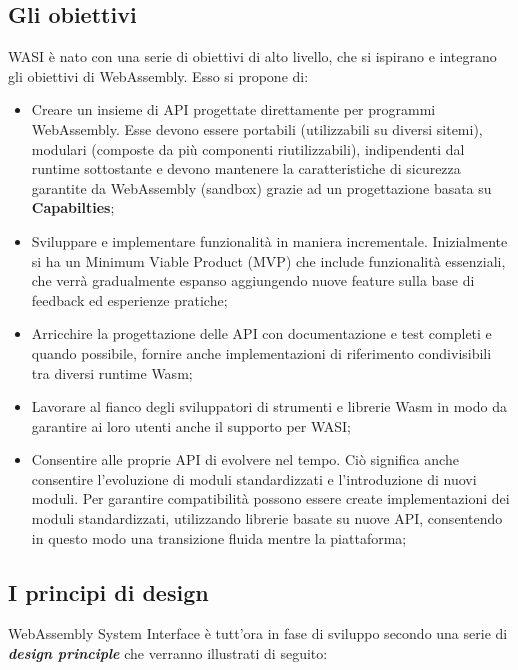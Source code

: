 \subsection{Gli obiettivi}
WASI è nato con una serie di obiettivi di alto livello, che si ispirano e integrano gli obiettivi di WebAssembly.\cite*{wasi:goals} Esso si propone di:
\begin{itemize}
        \item Creare un insieme di API progettate direttamente per programmi WebAssembly. Esse devono essere portabili (utilizzabili su diversi sitemi), modulari (composte da più componenti riutilizzabili), indipendenti dal runtime sottostante e devono mantenere la caratteristiche di sicurezza garantite da WebAssembly (sandbox) grazie ad un progettazione basata su \textbf{Capabilties};
        \item Sviluppare e implementare funzionalità in maniera incrementale. Inizialmente si ha un Minimum Viable Product (MVP) che include funzionalità essenziali, che verrà gradualmente espanso aggiungendo nuove feature sulla base di feedback ed esperienze pratiche;
        \item Arricchire la progettazione delle API con documentazione e test completi e quando possibile, fornire anche implementazioni di riferimento condivisibili tra diversi runtime Wasm;
        \item Lavorare al fianco degli sviluppatori di strumenti e librerie Wasm in modo da garantire ai loro utenti anche il supporto per WASI;
        \item Consentire alle proprie API di evolvere nel tempo. Ciò significa anche consentire l'evoluzione di moduli standardizzati e l'introduzione di nuovi moduli. Per garantire compatibilità possono essere create implementazioni dei moduli standardizzati, utilizzando librerie basate su nuove API, consentendo in questo modo una transizione fluida mentre la piattaforma;
\end{itemize}
\subsection{I principi di design}
WebAssembly System Interface è tutt'ora in fase di sviluppo secondo una serie di \emph{\textbf{design principle}} che verranno illustrati di seguito:\cite*{wasi:designPrinciples}
